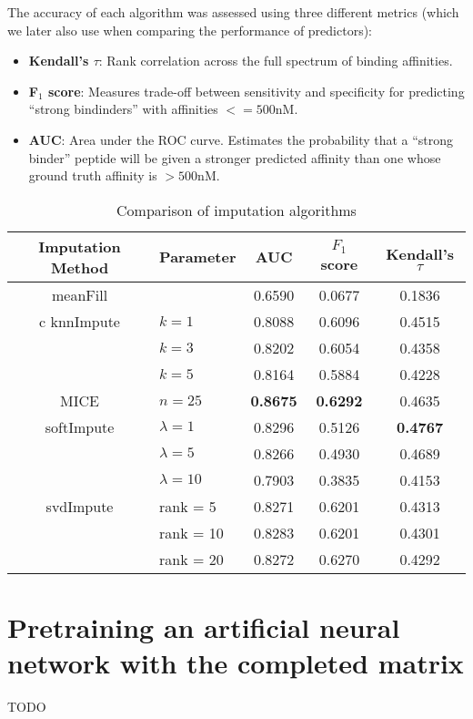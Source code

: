 The accuracy of each algorithm was assessed using three different metrics (which we later also use when comparing the performance of predictors):

\begin{itemize}
\item {\bf Kendall's $\tau$}: Rank correlation across the full spectrum of binding affinities.
\item {\bf F$_1$ score}: Measures trade-off between sensitivity and specificity for predicting ``strong bindinders'' with affinities $<= 500$nM. 
\item {\bf AUC}: Area under the ROC curve. Estimates the probability that a ``strong binder'' peptide will be given a stronger predicted affinity than one whose ground truth affinity is $>500$nM. 
\end{itemize}


\begin{table}[htbp]
\centering
\begin{tabular}{cl||ccc}
\toprule
Imputation Method & Parameter & AUC & $F_1$ score & Kendall's $\tau$ \\
\midrule 
meanFill &   & 0.6590  & 0.0677 & 0.1836 \\
\midrule c
knnImpute & $k = 1$ & 0.8088 & 0.6096 & 0.4515\\
  & $k = 3$ & 0.8202 & 0.6054 & 0.4358 \\
  & $k = 5$ & 0.8164 & 0.5884 & 0.4228 \\
\midrule
MICE & $n = 25$ & \bf{0.8675} & \bf{0.6292} & 0.4635 \\
\midrule
softImpute & $\lambda=1$ & 0.8296 & 0.5126 & \bf{0.4767} \\
& $\lambda=5$ & 0.8266 & 0.4930 & 0.4689 \\
& $\lambda=10$ & 0.7903 & 0.3835 & 0.4153 \\
\midrule
svdImpute & rank = 5 & 0.8271 & 0.6201 & 0.4313 \\
& rank = 10 & 0.8283 & 0.6201 & 0.4301 \\
& rank = 20 & 0.8272 & 0.6270 & 0.4292  \\
\bottomrule[1.25pt]
\end{tabular}
\begin{center}
\caption{Comparison of imputation algorithms}
\end{center}
\end{table}

\section*{Pretraining an artificial neural network with the completed matrix}

TODO
